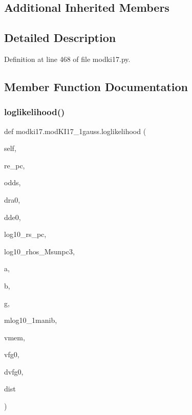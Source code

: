 \subsection*{Additional Inherited Members}


\subsection{Detailed Description}


Definition at line 468 of file modki17.\+py.



\subsection{Member Function Documentation}
\mbox{\label{classmodki17_1_1modKI17__1gauss_a33a9f117f11c57c90b8d95661ce9980b}} 
\subsubsection{\texorpdfstring{loglikelihood()}{loglikelihood()}}
{\footnotesize\ttfamily def modki17.\+mod\+K\+I17\+\_\+1gauss.\+loglikelihood (\begin{DoxyParamCaption}\item[{}]{self,  }\item[{}]{re\+\_\+pc,  }\item[{}]{odds,  }\item[{}]{dra0,  }\item[{}]{dde0,  }\item[{}]{log10\+\_\+rs\+\_\+pc,  }\item[{}]{log10\+\_\+rhos\+\_\+\+Msunpc3,  }\item[{}]{a,  }\item[{}]{b,  }\item[{}]{g,  }\item[{}]{mlog10\+\_\+1manib,  }\item[{}]{vmem,  }\item[{}]{vfg0,  }\item[{}]{dvfg0,  }\item[{}]{dist }\end{DoxyParamCaption})}



